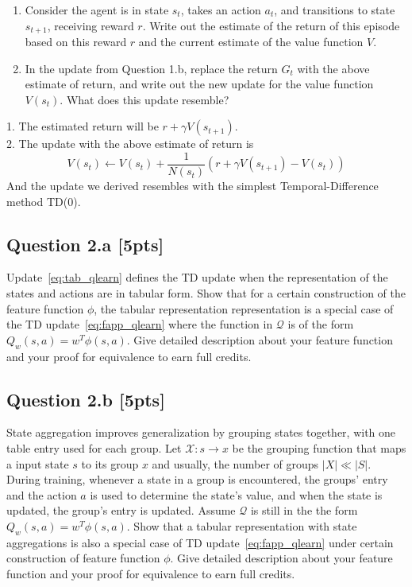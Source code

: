 \documentclass[12pt]{article}
\begin{document}
\begin{enumerate}
    \item Consider the agent is in state $s_t$, takes an action $a_t$, and transitions to state $s_{t+1}$, receiving reward $r$. Write out the estimate of the return of this episode based on this reward $r$ and the current estimate of the value function $V$. 
    \item In the update from Question 1.b, replace the return $G_t$ with the above estimate of return, and write out the new update for the value function $V(s_t)$. What does this update resemble?
\end{enumerate}

\noindent
\begin{solution}
1. The estimated return will be $r+\gamma V(s_{t+1})$.\\

2. The update with the above estimate of return is
$$V(s_{t})\longleftarrow V(s_{t})+\frac{1}{N(s_{t})}(r+\gamma V(s_{t+1})-V(s_{t}))$$
And the update we derived resembles with the simplest Temporal-Difference method TD(0).
\end{solution}


\subsection*{Question 2.a \textbf{[5pts]}}
Update~\ref{eq:tab_qlearn} defines the TD update when the representation of the states and actions are in tabular form. Show that for a certain construction of the feature function $\phi$, the tabular representation representation is a special case of the TD update~\ref{eq:fapp_qlearn} where the function in $\mathcal Q$ is of the form $Q _w(s, a) = w ^T \phi(s, a)$. Give detailed description about your feature function and your proof for equivalence to earn full credits. \\

\noindent
\begin{solution}
\end{solution}

\subsection*{Question 2.b \textbf{[5pts]}}
State aggregation improves generalization by grouping states together, with one table entry used for each group. Let $\mathcal{X}: s \to x$ be the grouping function that maps a input state $s$ to its group $x$ and usually, the number of groups $|X| \ll |S|$. During training, whenever a state in a group is encountered, the groups' entry and the action $a$ is used to determine the state's value, and when the state is updated, the group's entry is updated. Assume $\mathcal Q$ is still in the the form $Q _w(s, a) = w ^T \phi(s, a)$. Show that a tabular representation with state aggregations is also a special case of TD update~\ref{eq:fapp_qlearn} under certain construction of feature function $\phi$. Give detailed description about your feature function and your proof for equivalence to earn full credits. 
\end{document}
